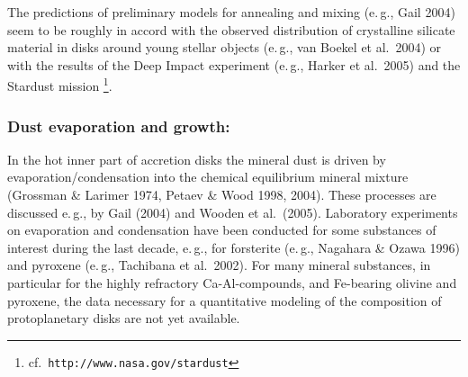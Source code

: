 The predictions of preliminary models for annealing and mixing
(e.\,g., Gail 2004) seem to be roughly in accord with the observed
distribution of crystalline silicate material in disks around
young stellar objects (e.\,g., van Boekel et al.~2004) or with the
results of the Deep Impact experiment (e.\,g., Harker et al.~2005)
and the Stardust mission%
\footnote{cf.\ \texttt{http://www.nasa.gov/stardust}}.

\subsubsection{Dust evaporation and growth:}
In the hot inner part of accretion disks the mineral dust is
driven by evaporation/condensation into the chemical equilibrium
mineral mixture (Grossman \& Larimer 1974, Petaev \& Wood 1998, 2004). 
These processes are discussed e.\,g., by Gail
(2004) and Wooden et al.~(2005). Laboratory experiments on
evaporation and condensation have been conducted for some
substances of interest during the last decade, e.\,g., for
forsterite (e.\,g., Nagahara \& Ozawa 1996) and pyroxene (e.\,g.,
Tachibana et al.~2002). For many mineral substances, in particular
for the highly refractory Ca-Al-compounds, and Fe-bearing olivine and pyroxene, the data necessary for a
quantitative modeling of the composition of protoplanetary disks
are not yet available.


